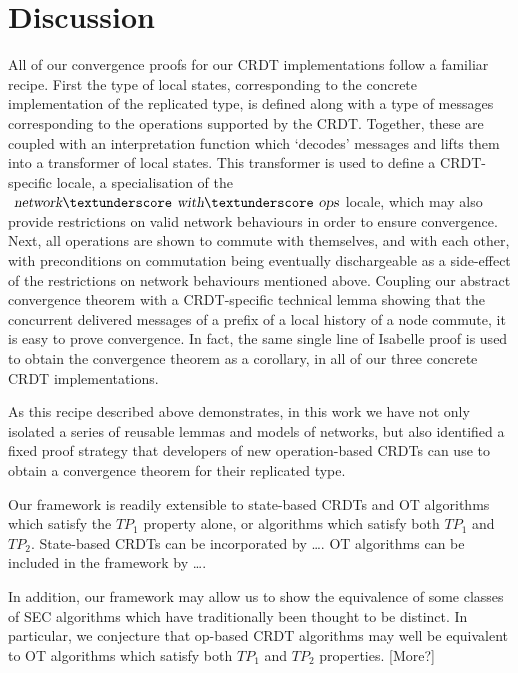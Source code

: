 \documentclass[acmlarge,review,anonymous]{acmart}\settopmatter{printfolios=true}
\begin{document}








\section{Discussion}
\label{sect.discussion}

All of our convergence proofs for our CRDT implementations follow a familiar recipe.
First the type of local states, corresponding to the concrete implementation of the replicated type, is defined along with a type of messages corresponding to the operations supported by the CRDT.
Together, these are coupled with an interpretation function which `decodes' messages and lifts them into a transformer of local states.
This transformer is used to define a CRDT-specific locale, a specialisation of the $\isa{network}{\isacharunderscore}\isa{with}{\isacharunderscore}\isa{ops}$ locale, which may also provide restrictions on valid network behaviours in order to ensure convergence.
Next, all operations are shown to commute with themselves, and with each other, with preconditions on commutation being eventually dischargeable as a side-effect of the restrictions on network behaviours mentioned above.
Coupling our abstract convergence theorem with a CRDT-specific technical lemma showing that the concurrent delivered messages of a prefix of a local history of a node commute, it is easy to prove convergence.
In fact, the same single line of Isabelle proof is used to obtain the convergence theorem as a corollary, in all of our three concrete CRDT implementations.

As this recipe described above demonstrates, in this work we have not only isolated a series of reusable lemmas and models of networks, but also identified a fixed proof strategy that developers of new operation-based CRDTs can use to obtain a convergence theorem for their replicated type.

Our framework is readily extensible to state-based CRDTs and OT algorithms which satisfy the $\mathit{TP}_1$  property alone, or algorithms which satisfy both $\mathit{TP}_1$ and $\mathit{TP}_2$. State-based CRDTs can be incorporated by \ldots. OT algorithms can be included in the framework by \ldots.
   
In addition, our framework may allow us to show the equivalence of some classes of SEC algorithms which have traditionally been thought to be distinct. In particular, we conjecture that op-based CRDT algorithms may well be equivalent to OT algorithms which satisfy both $\mathit{TP}_1$ and $\mathit{TP}_2$ properties. [More?]
\end{document}
